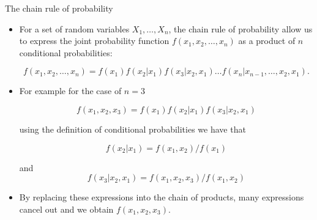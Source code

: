 \documentclass[handout]{beamer}
\begin{document}
\begin{frame}{The chain rule of probability}
\scriptsize{
\begin{itemize}

\item For a set of random variables $X_1,\dots, X_n$, the chain rule of probability allow us to express the joint probability function $f(x_1,x_2,\dots, x_n)$ as a product of $n$ conditional probabilities:



\begin{displaymath}
f(x_1,x_2,\dots,x_n)=f(x_1)f(x_2|x_1)f(x_3|x_2,x_1)\dots f(x_n|x_{n-1},\dots,x_2,x_1).
 \end{displaymath}

\item For example for the case of $n=3$

\begin{displaymath}
f(x_1,x_2,x_3)=f(x_1)f(x_2|x_1)f(x_3|x_2,x_1)
 \end{displaymath}

using the definition of conditional probabilities we have that


\begin{displaymath}
 f(x_2|x_1) = f(x_1,x_2)/f(x_1)
\end{displaymath}

 and \begin{displaymath}
f(x_3|x_2,x_1)=f(x_1,x_2,x_3)/f(x_1,x_2)       
     \end{displaymath}

\item By replacing these expressions into the chain of products, many expressions cancel out and we obtain $f(x_1,x_2,x_3)$.     

\end{itemize}



} 

\end{frame}
\end{document}
